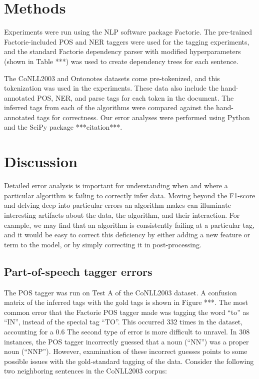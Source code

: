 \documentclass[12pt]{article}
\begin{document}
\section{Methods}
Experiments were run using the NLP software package Factorie. The pre-trained Factorie-included POS and NER taggers were used for the tagging experiments, and the standard Factorie dependency parser with modified hyperparameters (shown in Table ***) was used to create dependency trees for each sentence.

The CoNLL2003 and Ontonotes datasets come pre-tokenized, and this tokenization was used in the experiments. These data also include the hand-annotated POS, NER, and parse tags for each token in the document. The inferred tags from each of the algorithms were compared against the hand-annotated tags for correctness. Our error analyses were performed using Python and the SciPy package ***citation***.

\section{Discussion}
Detailed error analysis is important for understanding when and where a particular algorithm is failing to correctly infer data. Moving beyond the F1-score and delving deep into particular errors an algorithm makes can illuminate interesting artifacts about the data, the algorithm, and their interaction. For example, we may find that an algorithm is consistently failing at a particular tag, and it would be easy to correct this deficiency by either adding a new feature or term to the model, or by simply correcting it in post-processing.

\subsection{Part-of-speech tagger errors}
The POS tagger was run on Test A of the CoNLL2003 dataset. A confusion matrix of the inferred tags with the gold tags is shown in Figure ***. The most common error that the Factorie POS tagger made was tagging the word “to” as “IN”, instead of the special tag “TO”. This occurred 332 times in the dataset, accounting for a 0.6%
The second type of error is more difficult to unravel. In 308 instances, the POS tagger incorrectly guessed that a noun (“NN”) was a proper noun (“NNP”). However, examination of these incorrect guesses points to some possible issues with the gold-standard tagging of the data. Consider the following two neighboring sentences in the CoNLL2003 corpus:
\end{document}
